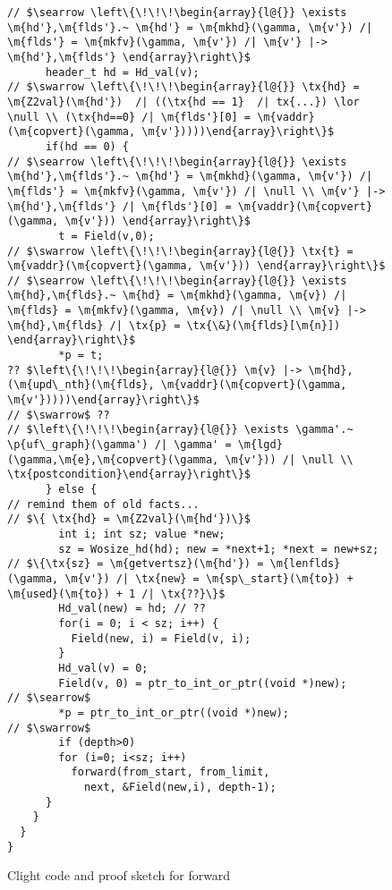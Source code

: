 \begin{figure}[t]
\begin{lstlisting}
// $\searrow \left\{\!\!\!\begin{array}{l@{}} \exists \m{hd'},\m{flds'}.~ \m{hd'} = \m{mkhd}(\gamma, \m{v'}) /| \m{flds'} = \m{mkfv}(\gamma, \m{v'}) /| \m{v'} |-> \m{hd'},\m{flds'} \end{array}\right\}$
      header_t hd = Hd_val(v);
// $\swarrow \left\{\!\!\!\begin{array}{l@{}} \tx{hd} = \m{Z2val}(\m{hd'})  /| ((\tx{hd == 1}  /| tx{...}) \lor \null \\ (\tx{hd==0} /| \m{flds'}[0] = \m{vaddr}(\m{copvert}(\gamma, \m{v'}))))\end{array}\right\}$
      if(hd == 0) {
// $\searrow \left\{\!\!\!\begin{array}{l@{}} \exists \m{hd'},\m{flds'}.~ \m{hd'} = \m{mkhd}(\gamma, \m{v'}) /| \m{flds'} = \m{mkfv}(\gamma, \m{v'}) /| \null \\ \m{v'} |-> \m{hd'},\m{flds'} /| \m{flds'}[0] = \m{vaddr}(\m{copvert}(\gamma, \m{v'})) \end{array}\right\}$
        t = Field(v,0);
// $\swarrow \left\{\!\!\!\begin{array}{l@{}} \tx{t} = \m{vaddr}(\m{copvert}(\gamma, \m{v'})) \end{array}\right\}$
// $\searrow \left\{\!\!\!\begin{array}{l@{}} \exists \m{hd},\m{flds}.~ \m{hd} = \m{mkhd}(\gamma, \m{v}) /| \m{flds} = \m{mkfv}(\gamma, \m{v}) /| \null \\ \m{v} |-> \m{hd},\m{flds} /| \tx{p} = \tx{\&}(\m{flds}[\m{n}]) \end{array}\right\}$
        *p = t;
?? $\left\{\!\!\!\begin{array}{l@{}} \m{v} |-> \m{hd},(\m{upd\_nth}(\m{flds}, \m{vaddr}(\m{copvert}(\gamma, \m{v'}))))\end{array}\right\}$
// $\swarrow$ ??
// $\left\{\!\!\!\begin{array}{l@{}} \exists \gamma'.~ \p{uf\_graph}(\gamma') /| \gamma' = \m{lgd}(\gamma,\m{e},\m{copvert}(\gamma, \m{v'})) /| \null \\ \tx{postcondition}\end{array}\right\}$
      } else {
// remind them of old facts...
// $\{ \tx{hd} = \m{Z2val}(\m{hd'})\}$
        int i; int sz; value *new;
        sz = Wosize_hd(hd); new = *next+1; *next = new+sz;
// $\{\tx{sz} = \m{getvertsz}(\m{hd'}) = \m{lenflds}(\gamma, \m{v'}) /| \tx{new} = \m{sp\_start}(\m{to}) + \m{used}(\m{to}) + 1 /| \tx{??}\}$        
        Hd_val(new) = hd; // ??
        for(i = 0; i < sz; i++) {
          Field(new, i) = Field(v, i);
        }
        Hd_val(v) = 0;
        Field(v, 0) = ptr_to_int_or_ptr((void *)new);
// $\searrow$
        *p = ptr_to_int_or_ptr((void *)new);
// $\swarrow$
        if (depth>0)
        for (i=0; i<sz; i++)
          forward(from_start, from_limit, 
            next, &Field(new,i), depth-1);
      }
    }
  }
}
\end{lstlisting}

\vspace{-0.4em}
\caption{Clight code and proof sketch for forward}
\label{fig:forward}
\vspace{-1em}
\end{figure}